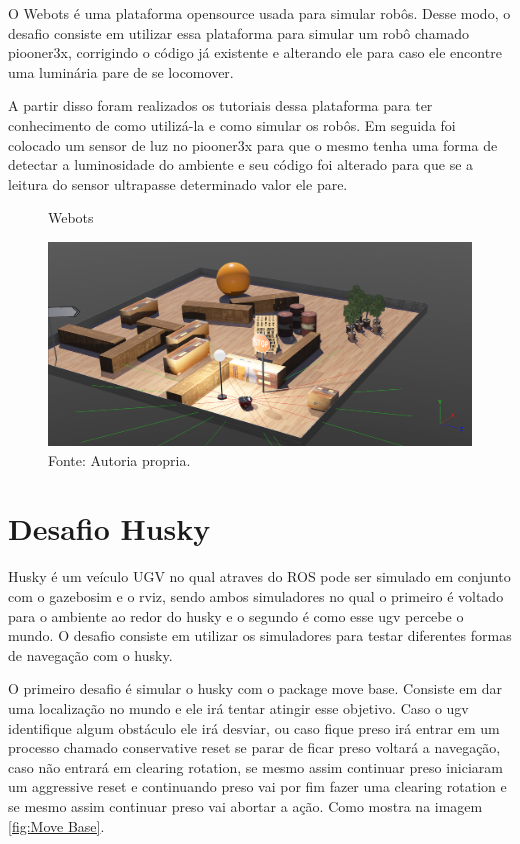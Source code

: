 O Webots é uma plataforma opensource usada para simular robôs. 
Desse modo, o desafio consiste em utilizar essa plataforma para 
simular um robô chamado piooner3x, corrigindo o código já existente
e alterando ele para caso ele encontre uma luminária pare de se locomover.

A partir disso foram realizados os tutoriais dessa plataforma para 
ter conhecimento de como utilizá-la e como simular os robôs. 
Em seguida foi colocado um sensor de luz no piooner3x para que 
o mesmo tenha uma forma de detectar a luminosidade do ambiente
e seu código foi alterado para que se a leitura do sensor 
ultrapasse determinado valor ele pare.

\begin{figure}[h!]
    \centering
    \caption{Webots}
    \includegraphics[width=1\textwidth]{Figures/webots3.png}
    \caption*{Fonte: Autoria propria.}
    \label{fig:Webots}
\end{figure}


\section{Desafio Husky}
Husky é um veículo UGV no qual atraves do ROS pode ser 
simulado em conjunto com o gazebosim e o rviz, sendo ambos
simuladores no qual o primeiro é voltado para o ambiente 
ao redor do husky e o segundo é como esse ugv percebe o mundo.
O desafio consiste em utilizar os simuladores para testar
diferentes formas de navegação com o husky.

O primeiro desafio é simular o husky com o package move base. 
Consiste em dar uma localização no mundo e ele irá tentar atingir 
esse objetivo. Caso o ugv identifique algum obstáculo ele irá desviar,
ou caso fique preso irá entrar em um processo chamado conservative reset
se parar de ficar preso voltará a navegação, caso não entrará em 
clearing rotation, se mesmo assim continuar preso iniciaram um aggressive reset
e continuando preso vai por fim fazer uma clearing rotation e se mesmo 
assim continuar preso vai abortar a ação. Como mostra na imagem \ref{fig:Move Base}.

